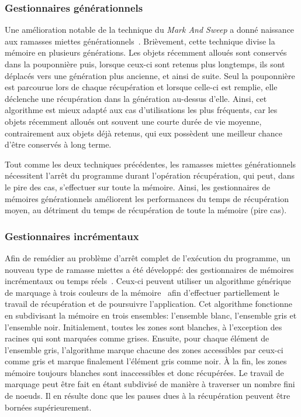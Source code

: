 \documentclass[12pt,twoside,letterpaper,francais]{book}
\begin{document}
\FloatBarrier
\subsubsection{Gestionnaires générationnels}
Une amélioration notable de la technique du \textit{Mark And Sweep} a
donné naissance aux ramasses miettes
générationnels~\cite{GEN_GC}. Brièvement, cette technique divise la
mémoire en plusieurs générations. Les objets récemment alloués sont
conservés dans la pouponnière puis, lorsque ceux-ci sont retenus plus
longtemps, ils sont déplacés vers une génération plus ancienne, et
ainsi de suite. Seul la pouponnière est parcourue lors de chaque
récupération et lorsque celle-ci est remplie, elle déclenche une
récupération dans la génération au-dessus d'elle. Ainsi, cet
algorithme est mieux adapté aux cas d'utilisations les plus fréquents,
car les objets récemment alloués ont souvent une courte durée de vie
moyenne, contrairement aux objets déjà retenus, qui eux possèdent une
meilleur chance d'être conservés à long terme.

Tout comme les deux techniques précédentes, les ramasses miettes
générationnels nécessitent l'arrêt du programme durant l'opération
récupération, qui peut, dans le pire des cas, s'effectuer sur toute la
mémoire. Ainsi, les gestionnaires de mémoires générationnels
améliorent les performances du temps de récupération moyen, au
détriment du temps de récupération de toute la mémoire (pire cas).


\FloatBarrier
\subsubsection{Gestionnaires incrémentaux}
Afin de remédier au problème d'arrêt complet de l'exécution du
programme, un nouveau type de ramasse miettes a été développé: des
gestionnaires de mémoires incrémentaux ou temps
réels~\cite{INCR_BAKER}. Ceux-ci peuvent utiliser un algorithme
générique de marquage à trois couleurs de la
mémoire~\cite{dijkstra-tricolour} afin d'effectuer partiellement le
travail de récupération et de poursuivre l'application. Cet algorithme
fonctionne en subdivisant la mémoire en trois ensembles: l'ensemble
blanc, l'ensemble gris et l'ensemble noir. Initialement, toutes les
zones sont blanches, à l'exception des racines qui sont marquées comme
grises. Ensuite, pour chaque élément de l'ensemble gris, l'algorithme
marque chacune des zones accessibles par ceux-ci comme gris et marque
finalement l'élément gris comme noir. À la fin, les zones mémoire
toujours blanches sont inaccessibles et donc récupérées.  Le travail
de marquage peut être fait en étant subdivisé de manière à traverser
un nombre fini de noeuds. Il en résulte donc que les pauses dues à la
récupération peuvent être bornées supérieurement.
\end{document}
